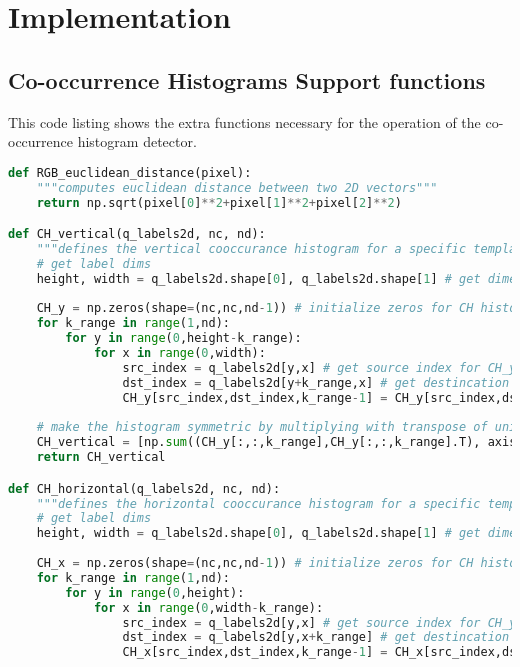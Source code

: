 \appendix

\chapter{Implementation}\label{appendix_implementation}

\section{Co-occurrence Histograms Support functions}\label{appendix_supportCH}
This code listing shows the extra functions necessary for the operation of the
co-occurrence histogram detector.
\begin{lstlisting}[language=Python, caption={Additional functions for Co-occurrence Histogram Detection}, captionpos=b, label={lst:supportCH}]
def RGB_euclidean_distance(pixel):
    """computes euclidean distance between two 2D vectors"""
    return np.sqrt(pixel[0]**2+pixel[1]**2+pixel[2]**2)

def CH_vertical(q_labels2d, nc, nd):
    """defines the vertical cooccurance histogram for a specific template according to quantized colourspace labels matrix and distances"""
    # get label dims
    height, width = q_labels2d.shape[0], q_labels2d.shape[1] # get dimensions
    
    CH_y = np.zeros(shape=(nc,nc,nd-1)) # initialize zeros for CH histogram according to quantizations size
    for k_range in range(1,nd):
        for y in range(0,height-k_range):
            for x in range(0,width):
                src_index = q_labels2d[y,x] # get source index for CH_y at (y,x)
                dst_index = q_labels2d[y+k_range,x] # get destincation index for CH_y at (y+k,x)
                CH_y[src_index,dst_index,k_range-1] = CH_y[src_index,dst_index,k_range-1] + 1 # update histogram count in bin (src_index,dst_index)
                
    # make the histogram symmetric by multiplying with transpose of unidirectional cooccurance histogram
    CH_vertical = [np.sum((CH_y[:,:,k_range],CH_y[:,:,k_range].T), axis=0) for k_range in range(0,nd-1)]
    return CH_vertical

def CH_horizontal(q_labels2d, nc, nd):
    """defines the horizontal cooccurance histogram for a specific template according to quantized colourspace labels matrix and distances"""
    # get label dims
    height, width = q_labels2d.shape[0], q_labels2d.shape[1] # get dimensions
    
    CH_x = np.zeros(shape=(nc,nc,nd-1)) # initialize zeros for CH histogram according to quantizations size
    for k_range in range(1,nd):
        for y in range(0,height):
            for x in range(0,width-k_range):
                src_index = q_labels2d[y,x] # get source index for CH_y at (y,x)
                dst_index = q_labels2d[y,x+k_range] # get destincation index for CH_y at (y+k,x)
                CH_x[src_index,dst_index,k_range-1] = CH_x[src_index,dst_index,k_range-1] + 1 # update histogram count in bin (src_index,dst_index)
    

\end{lstlisting}
